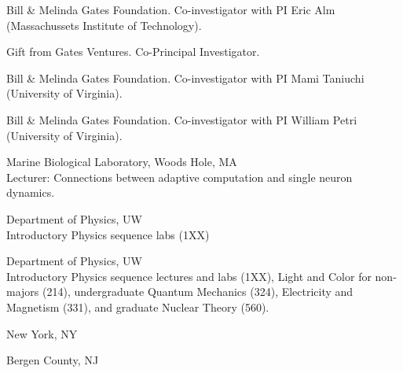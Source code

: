 \documentclass{article}
\begin{document}
\begin{llist}
 Bill \& Melinda Gates Foundation. Co-investigator with PI Eric Alm (Massachussets Institute of Technology).   %

 Gift from Gates Ventures. Co-Principal Investigator.  %

 Bill \& Melinda Gates Foundation. Co-investigator with PI Mami Taniuchi (University of Virginia).    %

 Bill \& Melinda Gates Foundation. Co-investigator with PI William Petri (University of Virginia).   %



 \vspace{4pt}

Marine Biological Laboratory, Woods Hole, MA\\
Lecturer: Connections between adaptive computation and single neuron dynamics.

 Department of Physics, UW \\
Introductory Physics sequence labs (1XX)

 Department of Physics, UW\\
Introductory Physics sequence lectures and labs (1XX), Light and Color for non-majors (214), undergraduate Quantum Mechanics (324), Electricity and Magnetism (331), and graduate Nuclear Theory (560). 

 New York, NY

 Bergen County, NJ


\end{llist}
\end{document}
